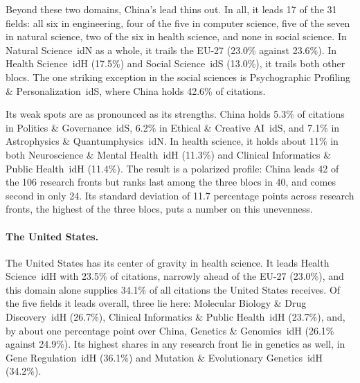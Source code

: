 \documentclass[10pt,twocolumn,a4paper]{article}
\newcommand{\cl}[3]{\textsf{#1}~\csname id#2\endcsname{#3}}
\begin{document}
	Beyond these two domains, China's lead thins out. In all, it leads 17 of the 31 fields: all six in engineering, four of the five in computer science, five of the seven in natural science, two of the six in health science, and none in social science. In \cl{Natural Science}{N}{3} as a whole, it trails the EU-27 (23.0\% against 23.6\%). In \cl{Health Science}{H}{1} (17.5\%) and \cl{Social Science}{S}{2} (13.0\%), it trails both other blocs. The one striking exception in the social sciences is \cl{Psychographic Profiling \& Personalization}{S}{245}, where China holds 42.6\% of citations.
	
	Its weak spots are as pronounced as its strengths. China holds 5.3\% of citations in \cl{Politics \& Governance}{S}{22}, 6.2\% in \cl{Ethical \& Creative AI}{S}{26}, and 7.1\% in \cl{Astrophysics \& Quantumphysics}{N}{34}. In health science, it holds about 11\% in both \cl{Neuroscience \& Mental Health}{H}{11} (11.3\%) and \cl{Clinical Informatics \& Public Health}{H}{12} (11.4\%). The result is a polarized profile: China leads 42 of the 106 research fronts but ranks last among the three blocs in 40, and comes second in only 24. Its standard deviation of 11.7 percentage points across research fronts, the highest of the three blocs, puts a number on this unevenness.
	
	\paragraph{The United States.} The United States has its center of gravity in health science. It leads \cl{Health Science}{H}{1} with 23.5\% of citations, narrowly ahead of the EU-27 (23.0\%), and this domain alone supplies 34.1\% of all citations the United States receives. Of the five fields it leads overall, three lie here: \cl{Molecular Biology \& Drug Discovery}{H}{13} (26.7\%), \cl{Clinical Informatics \& Public Health}{H}{12} (23.7\%), and, by about one percentage point over China, \cl{Genetics \& Genomics}{H}{15} (26.1\% against 24.9\%). Its highest shares in any research front lie in genetics as well, in \cl{Gene Regulation}{H}{151} (36.1\%) and \cl{Mutation \& Evolutionary Genetics}{H}{152} (34.2\%).
	
\end{document}
